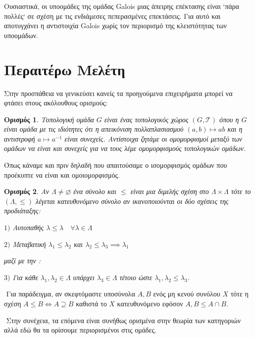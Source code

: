 \documentclass[oneside,a4paper]{article}
\newtheorem*{defn}{Ορισμός}
\newcommand {\tl}{\textlatin}
\begin{document}
Ουσιαστικά, οι υποομάδες της ομάδας \tl{Galois} μιας άπειρης επέκτασης είναι `πάρα πολλές` σε σχέση με τις ενδιάμεσες πεπερασμένες επεκτάσεις. Για αυτό και αποτυγχάνει η αντιστοιχία \tl{Galois} χωρίς τον περιορισμό της κλειστότητας των υποομάδων.


\pagebreak
\section{Περαιτέρω Μελέτη}


Στην προσπάθεια να γενικεύσει κανείς τα προηγούμενα επιχειρήματα μπορεί να φτάσει στους ακόλουθους ορισμούς:

\begin{defn}Τοπολογική ομάδα $G$ είναι ένας τοπολογικός χώρος $(G,\mathcal T )$ όπου η $G$ είναι ομάδα με τις ιδιότητες ότι η απεικόνιση πολλαπλασιασμού $(a,b) \mapsto ab$ και η αντιστροφή $a \mapsto a^{-1}$ είναι συνεχείς. Αντίστοιχα ζητάμε οι ομομορφισμοί μεταξύ των ομάδων να είναι και συνεχείς για να τους λέμε ομομορφισμούς τοπολογικών ομάδων.
\end{defn}

\noindent Όπως κάναμε και πριν δηλαδή που απαιτούσαμε ο ισομορφισμός ομάδων που προέκυπτε να είναι και ομοιομορφισμός.

\begin{defn} Αν $\Lambda\neq \varnothing$ ένα σύνολο και $\leq$ είναι μια διμελής σχέση στο $\Lambda \times \Lambda$ τότε το $(\Lambda , \leq )$ λέγεται κατευθυνόμενο σύνολο αν ικανοποιούνται οι δύο σχέσεις της προδιάταξης:

	$1)$ Αυτοπαθής $\lambda \leq \lambda \quad\forall \lambda \in \Lambda$
	
	$2)$ Μεταβατική $\lambda_1 \leq \lambda_2$ και  $\lambda_2 \leq \lambda_3 \implies \lambda_1$ 
	
	μαζί με την :
	
	$3)$ Για κάθε $\lambda_1 , \lambda_2 \in \Lambda$ υπάρχει $\lambda_3 \in \Lambda$ τέτοιο ώστε $\lambda_1, \lambda_2 \leq \lambda_3$.
	\end{defn}

$ $\newline
\noindent Για παράδειγμα, αν σκεφτόμαστε υποσύνολα $A,B$ ενός μη κενού συνόλου $X$ τότε η σχέση $A\leq B \iff A\supseteq B$ καθιστά το $X$ κατευθυνόμενο εφόσον $A, B \leq A\cap B$.

$ $\newline
\noindent Στην συνέχεια, τα επόμενα είναι συνήθως ορισμένα στην θεωρία των κατηγοριών αλλά εδώ θα τα ορίσουμε περιορισμένοι στις ομάδες.
\end{document}
